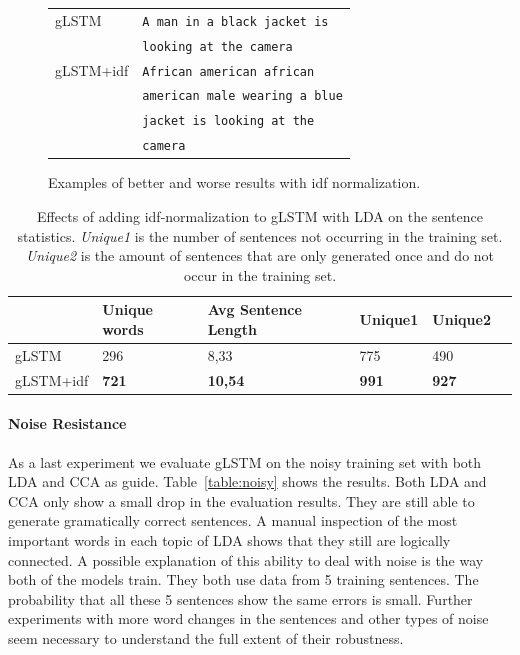 \documentclass[twoside,twocolumn]{article}
\begin{document}
\begin{figure}
\begin{minipage}[t]{.45\textwidth}
		\end{minipage}\hfill
		\begin{minipage}[t]{.7\textwidth}
			\vspace{0pt}
			\begin{tabular}{ll}
				gLSTM & \texttt{A man in a black jacket is} \\ 
				~ & \texttt{looking at the camera} \\
				gLSTM+idf & \texttt{African american african}\\
				~ & \texttt{american male wearing a blue} \\
				~ & \texttt{jacket is looking at the} \\
				~ & \texttt{camera} \\
			\end{tabular}
		\end{minipage}
		\caption{Examples of better and worse results with idf normalization.}
		\label{fig:idf}
	\end{figure}
	
	\begin{table}
		\centering
		\begin{tabular}{llllll}
			~                   & Unique words& Avg Sentence Length & Unique1 & Unique2 \\ \hline
			gLSTM                         & 296   & 8,33   & 775   & 490  \\
			
			gLSTM+idf                 & \textbf{721}   & \textbf{10,54}   & \textbf{991}   & \textbf{927}    \\\hline
		\end{tabular}
		\caption{Effects of adding idf-normalization to gLSTM with LDA on the sentence statistics. \emph{Unique1} is the number of sentences not occurring in the training set. \emph{Unique2} is the amount of sentences that are only generated once and do not occur in the training set.}
		\label{table:idf-stats}
	\end{table}
	
	\paragraph{Noise Resistance}
	As a last experiment we evaluate gLSTM on the noisy training set with both LDA and CCA as guide.
	Table~\ref{table:noisy} shows the results. Both LDA and CCA only show a small drop in the evaluation results. They are still able to generate gramatically correct sentences. A manual inspection of the most important words in each topic of LDA shows that they still are logically connected. A possible explanation of this ability to deal with noise is the way both of the models train. They both use data from 5 training sentences. The probability that all these 5 sentences show the same errors is small. Further experiments with more word changes in the sentences and other types of noise seem necessary to understand the full extent of their robustness.
	
\end{document}
